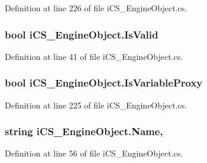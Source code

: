Definition at line 226 of file i\+C\+S\+\_\+\+Engine\+Object.\+cs.

\hypertarget{classi_c_s___engine_object_a8fe552c05ae20584fd407c30aa14929f}{
\subsubsection[{Is\+Valid}]{\setlength{\rightskip}{0pt plus 5cm}bool i\+C\+S\+\_\+\+Engine\+Object.\+Is\+Valid\hspace{0.3cm}{\ttfamily [get]}}}\label{classi_c_s___engine_object_a8fe552c05ae20584fd407c30aa14929f}


Definition at line 41 of file i\+C\+S\+\_\+\+Engine\+Object.\+cs.

\hypertarget{classi_c_s___engine_object_ab6e242370f4a478a88062b74c8078687}{
\subsubsection[{Is\+Variable\+Proxy}]{\setlength{\rightskip}{0pt plus 5cm}bool i\+C\+S\+\_\+\+Engine\+Object.\+Is\+Variable\+Proxy\hspace{0.3cm}{\ttfamily [get]}}}\label{classi_c_s___engine_object_ab6e242370f4a478a88062b74c8078687}


Definition at line 225 of file i\+C\+S\+\_\+\+Engine\+Object.\+cs.

\hypertarget{classi_c_s___engine_object_ae9494fcdc0253806e10e08f35d95d4fd}{
\subsubsection[{Name}]{\setlength{\rightskip}{0pt plus 5cm}string i\+C\+S\+\_\+\+Engine\+Object.\+Name\hspace{0.3cm}{\ttfamily [get]}, {\ttfamily [set]}}}\label{classi_c_s___engine_object_ae9494fcdc0253806e10e08f35d95d4fd}


Definition at line 56 of file i\+C\+S\+\_\+\+Engine\+Object.\+cs.

